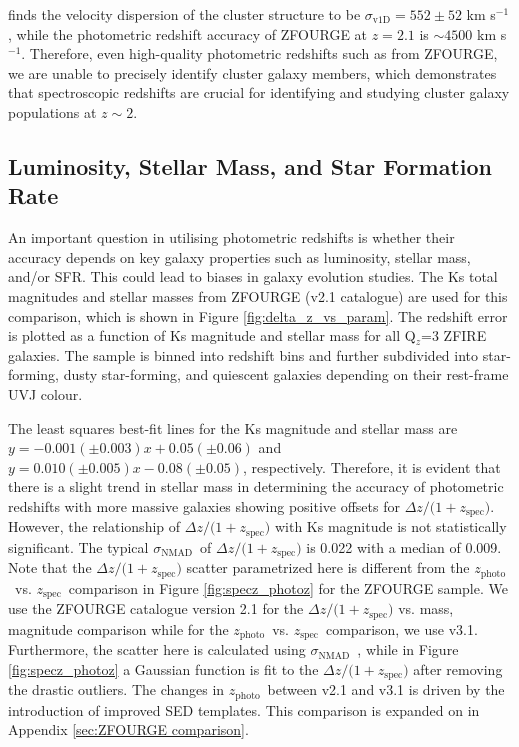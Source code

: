 \documentclass[iop]{emulateapj}
\newcommand{\NMAD}{$\sigma_{\mathrm{NMAD}}$}
\newcommand{\zspec}{$z_{\mathrm{spec}}$}
\newcommand{\zphoto}{$z_{\mathrm{photo}}$}
\begin{document}
\citet{Yuan2014} finds the velocity dispersion of the cluster structure to be $\sigma_{\mathrm{v1D}}= 552\pm52$ km s$^{-1}$, while the photometric redshift accuracy of ZFOURGE at $z=2.1$ is $\sim4500$ km s$^{-1}$. Therefore, even high-quality photometric redshifts such as from ZFOURGE, we are unable to precisely identify cluster galaxy members, which demonstrates that  spectroscopic redshifts are crucial for identifying and studying cluster galaxy populations at $z\sim2$. 


\subsection{Luminosity, Stellar Mass, and Star Formation Rate}
\label{sec:M-SFR-dz}

An important question in utilising photometric redshifts is whether their accuracy depends on key galaxy properties such as luminosity, stellar mass, and/or SFR. This could lead
to biases in galaxy evolution studies.
The Ks total magnitudes and stellar masses from ZFOURGE (v2.1 catalogue) are used for this comparison, which is shown in Figure \ref{fig:delta_z_vs_param}.
The redshift error is plotted as a function of Ks magnitude and stellar mass for all Q$_z$=3 ZFIRE galaxies. The sample is binned into redshift bins and further subdivided into star-forming, dusty star-forming, and quiescent galaxies depending on their rest-frame UVJ colour. 


The least squares best-fit lines for the Ks magnitude and stellar mass are $y=-0.001 (\pm0.003)x+0.05 (\pm0.06)$ and $y=0.010 (\pm0.005)x-0.08 (\pm0.05)$, respectively.
Therefore, it is evident that there is a slight trend in stellar mass in determining the accuracy of photometric redshifts with more massive galaxies showing positive offsets for $\Delta z/(1+$\zspec$)$.
However, the relationship of $\Delta z/(1+$\zspec$)$ with Ks magnitude is not statistically significant.
The typical \NMAD\ of $\Delta z/(1+$\zspec$)$ is 0.022 with a median of 0.009. 
Note that the $\Delta z/(1+$\zspec$)$ scatter parametrized here is different from the \zphoto\ vs. \zspec\ comparison in Figure \ref{fig:specz_photoz} for the ZFOURGE sample. We use the ZFOURGE catalogue version 2.1 for the  $\Delta z/(1+$\zspec$)$ vs. mass, magnitude comparison while for the \zphoto\ vs. \zspec\ comparison,  we use v3.1. Furthermore, the scatter here is calculated using \NMAD\ , while in Figure \ref{fig:specz_photoz} a Gaussian function is fit to the $\Delta z/(1+$\zspec$)$ after removing the drastic outliers. The changes in \zphoto\ between v2.1 and v3.1 is driven by the introduction of improved SED templates. This comparison is expanded on in Appendix \ref{sec:ZFOURGE comparison}. 
 
\end{document}
